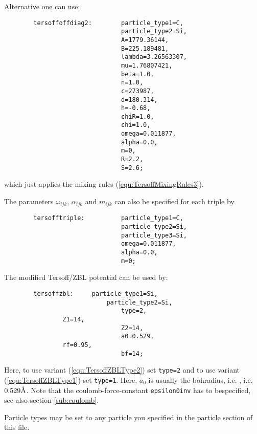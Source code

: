 Alternative one can use:
\begin{lstlisting}
        tersoffoffdiag2:        particle_type1=C,       
                                particle_type2=Si,      
                                A=1779.36144,   
                                B=225.189481,   
                                lambda=3.26563307,      
                                mu=1.76807421,  
                                beta=1.0,       
                                n=1.0,  
                                c=273987,       
                                d=180.314,      
                                h=-0.68,        
                                chiR=1.0,      
                                chi=1.0,       
                                omega=0.011877,
                                alpha=0.0, 
                                m=0,
                                R=2.2,  
                                S=2.6;
\end{lstlisting}
which just applies the mixing rules  (\ref{equ:TersoffMixingRules3}).

The parameters $\omega_{ijk}$, $\alpha_{ijk}$ and $m_{ijk}$ can also be specified for each triple by
\begin{lstlisting}
        tersofftriple:          particle_type1=C,       
                                particle_type2=Si,      
                                particle_type3=Si,  
                                omega=0.011877,
                                alpha=0.0, 
                                m=0;
\end{lstlisting}

The modified Tersoff/ZBL potential can be used by:
\begin{lstlisting}
        tersoffzbl:		particle_type1=Si,
	                        particle_type2=Si,	
                                type=2,
				Z1=14,			
                                Z2=14,			
                                a0=0.529,
				rf=0.95, 		
                                bf=14;
\end{lstlisting}
Here, to use variant (\ref{equ:TersoffZBLType2}) set \verb+type=2+ and
to use variant (\ref{equ:TersoffZBLType1}) set \verb+type=1+.
Here, $a_0$ is usually the bohradius, i.e. , i.e. $0.529 \text{\normalfont\AA}$. Note that the coulomb-force-constant \verb+epsilon0inv+ has to bespecified, see also section \ref{sub:coulomb}.

Particle types may be set to any particle you specified in the particle section of this file.

